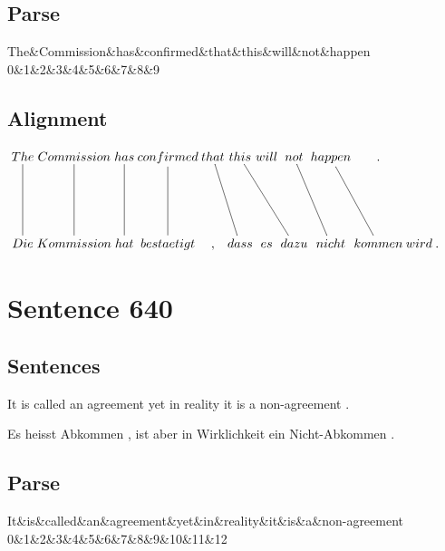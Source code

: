 \documentclass{report}
\begin{document}
\subsection*{Parse}
\begin{dependency}[theme=simple]
\begin{deptext}[column sep=.5cm, row sep=.1ex]
The\&Commission\&has\&confirmed\&that\&this\&will\&not\&happen\\
0\&1\&2\&3\&4\&5\&6\&7\&8\&9\\
\end{deptext}
\end{dependency}


\subsection*{Alignment}
\scriptsize{
$
\xymatrix@C-2.3pc{
The \ar @{-} [dd] & Commission \ar @{-} [dd] & has \ar @{-} [dd] & confirmed \ar @{-} [dd] & that \ar @{-} [ddr] & this \ar @{-} [ddrr] & will & not \ar @{-} [ddr] & happen \ar @{-} [ddr] & .\\\\
Die & Kommission & hat & bestaetigt & , & dass & es & dazu & nicht & kommen & wird & .
}$}
\newpage\section*{Sentence 640}

\subsection*{Sentences}
It is called an agreement yet in reality it is a non-agreement .

\noindent Es heisst Abkommen , ist aber in Wirklichkeit ein Nicht-Abkommen .



\subsection*{Parse}
\begin{dependency}[theme=simple]
\begin{deptext}[column sep=.5cm, row sep=.1ex]
It\&is\&called\&an\&agreement\&yet\&in\&reality\&it\&is\&a\&non-agreement\\
0\&1\&2\&3\&4\&5\&6\&7\&8\&9\&10\&11\&12\\
\end{deptext}
\end{dependency}
\end{document}

